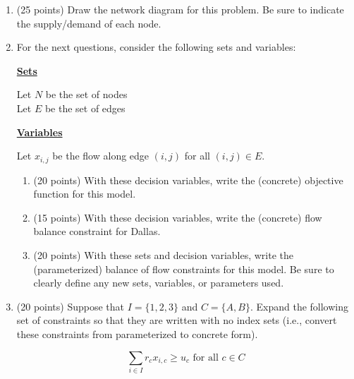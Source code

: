 \documentclass[letterpaper,oneside,12pt]{article}%
\begin{document}
\begin{enumerate}
\item (25 points) Draw the network diagram for this problem. Be sure to indicate the supply/demand of each node. \newpage

\item For the next questions, consider the following sets and variables:

\textbf{\underline{Sets}} 

Let $N$ be the set of nodes \\
Let $E$ be the set of edges

\textbf{\underline{Variables}} 

Let $x_{i,j}$ be the flow along edge $(i,j)$ for all $(i,j) \in E$.

	\begin{enumerate}
	\item (20 points) With these decision variables, write the (concrete) objective function for this model. \vspace{1.5in}
	\item (15 points) With these decision variables, write the (concrete) flow balance constraint for Dallas. \vspace{1in}
	\item (20 points) With these sets and decision variables, write the (parameterized) balance of flow constraints for this model. Be sure to clearly define any new sets, variables, or parameters used.  \vspace{1.5in}
	\end{enumerate}
\item (20 points) Suppose that $I = \{1,2,3\}$ and $C = \{A,B\}$. Expand the following set of constraints so that they are written with no index sets (i.e., convert these constraints from parameterized to concrete form).

\[
\sum_{i \in I} r_c x_{i,c} \geq u_c \text{ for all $c \in C$}
\]

\end{enumerate}
\end{document}
